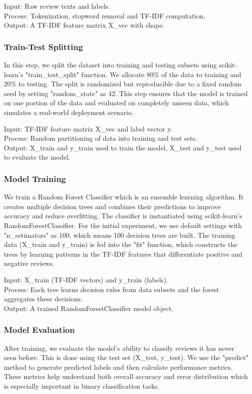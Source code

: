 Input: Raw review texts and labels.\\
Process: Tokenization, stopword removal and TF-IDF computation.\\
Output: A TF-IDF feature matrix X\_vec with shape.

\subsubsection*{Train-Test Splitting}
In this step, we split the dataset into training and testing subsets using scikit-learn's "train\_test\_split" function. We allocate 80\% of the data to training and 20\% to testing. The split is randomized but reproducible due to a fixed random seed by setting "random\_state" as 42.
This step ensures that the model is trained on one portion of the data and evaluated on completely unseen data, which simulates a real-world deployment scenario.

Input: TF-IDF feature matrix X\_vec and label vector y. \\
Process: Random partitioning of data into training and test sets. \\
Output: X\_train and y\_train used to train the model, X\_test and y\_test used to evaluate the model.

\subsubsection*{Model Training}
We train a Random Forest Classifier which is an ensemble learning algorithm. It creates multiple decision trees and combines their predictions to improve accuracy and reduce overfitting.
The classifier is instantiated using scikit-learn's RandomForestClassifier. For the initial experiment, we use default settings with "n\_estimators" as 100, which means 100 decision trees are built.
The training data (X\_train and y\_train) is fed into the "fit" function, which constructs the trees by learning patterns in the TF-IDF features that differentiate positive and negative reviews.

Input: X\_train (TF-IDF vectors) and y\_train (labels). \\
Process: Each tree learns decision rules from data subsets and the forest aggregates these decisions.\\
Output: A trained RandomForestClassifier model object.

\subsubsection*{Model Evaluation}
After training, we evaluate the model's ability to classify reviews it has never seen before. This is done using the test set (X\_test, y\_test).
We use the "predict" method to generate predicted labels and then calculate performance metrics. These metrics help understand both overall accuracy and error distribution which is especially important in binary classification tasks.

